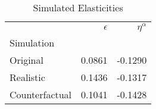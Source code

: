 \begin{table}
\centering
\caption{Simulated Elasticities}
\label{tab:elasts}
\begin{tabular}{lrr}
\toprule
{} & $\epsilon$ & $\eta^{\alpha}$ \\
Simulation     &            &                 \\
\midrule
Original       &     0.0861 &         -0.1290 \\
Realistic      &     0.1436 &         -0.1317 \\
Counterfactual &     0.1041 &         -0.1428 \\
\bottomrule
\end{tabular}
\end{table}
